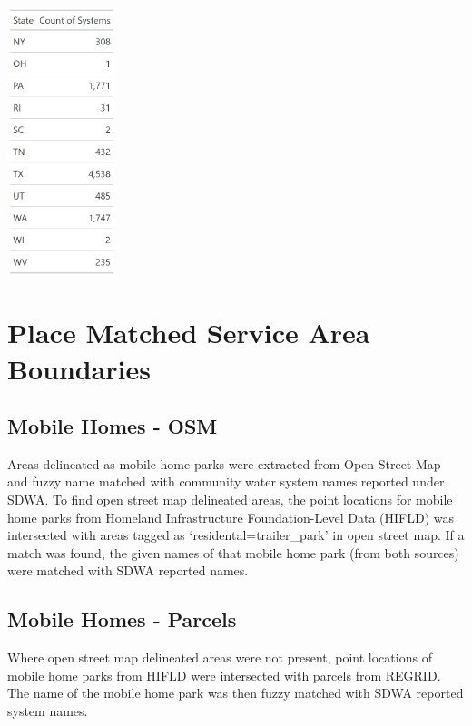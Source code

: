 \documentclass[
  letterpaper,
  DIV=11,
  numbers=noendperiod,
  oneside]{scrartcl}
\begin{document}
\begin{table}
\begin{minipage}{0.33\linewidth}
\begin{center}
\includegraphics[width=1.25in,height=\textheight]{img/state_table_3.png}
\end{center}
\end{minipage}%

\end{table}%

\section{Place Matched Service Area
Boundaries}\label{place-matched-service-area-boundaries}

\subsection{Mobile Homes - OSM}\label{mobile-homes---osm}

Areas delineated as mobile home parks were extracted from Open Street
Map and fuzzy name matched with community water system names reported
under SDWA. To find open street map delineated areas, the point
locations for mobile home parks from Homeland Infrastructure
Foundation-Level Data (HIFLD) was intersected with areas tagged as
`residental=trailer\_park' in open street map. If a match was found, the
given names of that mobile home park (from both sources) were matched
with SDWA reported names.

\subsection{Mobile Homes - Parcels}\label{mobile-homes---parcels}

Where open street map delineated areas were not present, point locations
of mobile home parks from HIFLD were intersected with parcels from
\href{https://app.regrid.com/us\#}{REGRID}. The name of the mobile home
park was then fuzzy matched with SDWA reported system names.
\end{document}
